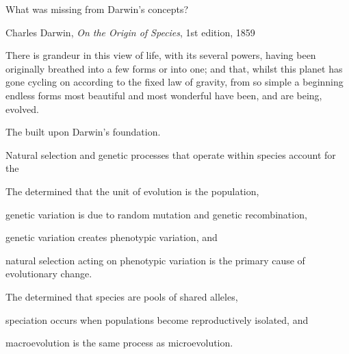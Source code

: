 \documentclass[t]{beamer}
\begin{document}
\begin{frame}[t]{What was missing from Darwin's concepts?}
\vspace{-\baselineskip}
\begin{multicols}{2}
\bigskip


\vspace{7\baselineskip}

Charles Darwin, \textit{On the Origin of Species}, 1st edition, 1859

	\columnbreak
	\begin{displayquote}There is grandeur in this view of life, with its several powers, having been originally breathed into a few forms or into one; and that, whilst this planet has gone cycling on according to the fixed law of gravity, from so simple a beginning endless forms most beautiful and most wonderful have been, and are being, evolved.\end{displayquote}
	
	
\end{multicols}
\end{frame}

\begin{frame}{The  built upon Darwin's foundation.}

\hangpara Natural selection and genetic processes that operate within species account for the 

\end{frame}

\begin{frame}[t]{The  determined that}
\hangpara the unit of evolution is the population,

\hangpara genetic variation is due to random mutation and genetic recombination,

\hangpara genetic variation creates phenotypic variation, and

\hangpara natural selection acting on phenotypic variation is the primary cause of evolutionary change.

\end{frame}

\begin{frame}[t]{The  determined that}
\hangpara species are pools of shared alleles, 

\hangpara speciation occurs when populations become reproductively isolated, and

\hangpara macroevolution is the same process as microevolution.


\end{frame}
\end{document}
